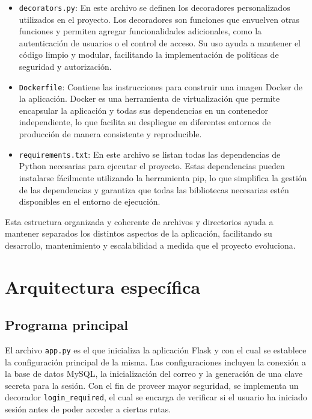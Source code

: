 \documentclass[a4paper, 12pt]{book}
\begin{document}
\begin{itemize}
  \item \texttt{decorators.py}: En este archivo se definen los decoradores personalizados utilizados en el proyecto. Los decoradores son funciones que envuelven otras funciones y permiten agregar funcionalidades adicionales, como la autenticación de usuarios o el control de acceso. Su uso ayuda a mantener el código limpio y modular, facilitando la implementación de políticas de seguridad y autorización.
  \item \texttt{Dockerfile}: Contiene las instrucciones para construir una imagen Docker de la aplicación. Docker es una herramienta de virtualización que permite encapsular la aplicación y todas sus dependencias en un contenedor independiente, lo que facilita su despliegue en diferentes entornos de producción de manera consistente y reproducible.
  \item \texttt{requirements.txt}: En este archivo se listan todas las dependencias de Python necesarias para ejecutar el proyecto. Estas dependencias pueden instalarse fácilmente utilizando la herramienta pip, lo que simplifica la gestión de las dependencias y garantiza que todas las bibliotecas necesarias estén disponibles en el entorno de ejecución.
\end{itemize}

Esta estructura organizada y coherente de archivos y directorios ayuda a mantener separados los distintos aspectos de la aplicación, facilitando su desarrollo, mantenimiento y escalabilidad a medida que el proyecto evoluciona.
\section{Arquitectura específica} 
\label{sec:arquitectura}

\subsection{Programa principal}
\label{subsec:programaprincipal}

El archivo \texttt{app.py} es el que inicializa la aplicación Flask y con el cual se establece la configuración principal de la misma. Las configuraciones incluyen la conexión a la base de datos 
MySQL, la inicialización del correo y la generación de una clave secreta para la sesión.
Con el fin de proveer mayor seguridad, se implementa un decorador \texttt{login\_required}, el cual se encarga de verificar si el usuario ha iniciado sesión antes de 
poder acceder a ciertas rutas.
\end{document}
